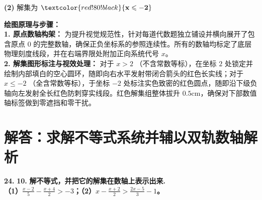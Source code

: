 \vspace{0.6cm}
\noindent \textbf{(2)} 解集为 $\textcolor{red!80!black}{\mathbf{x \leqslant -2}}$ \par\vspace{0.2cm}
\begin{center}
\end{center}

\vspace{0.4cm}
{\small\color{blue!70!black}
\textbf{绘图原理与步骤：}\\
\textbf{1. 原点数轴构架：} 为提升视觉规范性，针对每道代数题独立铺设并横向展开了包含原点 $0$ 的完整数轴，确保正负坐标系的参照连续性。所有的数轴均标定了底层物理刻度线段，并在右端界限处附加正向系统代号 $x$。\\
\textbf{2. 解集图形标注与视效处理：} 对于 $x > 2$ （不含常数等标），在坐标 $2$ 处锁定并绘制内部填白的空心圆环，随即向右水平发射带闭合箭头的红色长实线；对于 $x \leqslant -2$ （全含常数等标），于坐标 $-2$ 处标注实色致密的红色圆点，随即沿下级负轴向左发射全长红色防刺穿实线段。红色解集组整体拔升 $0.5\mathrm{cm}$，确保对下部数值轴标签做到零遮挡和零干扰。
}

\newpage



\section{解答：求解不等式系统并辅以双轨数轴解析}

\vspace{0.6cm}

\textbf{\LARGE 24.} \textbf{\color{cyan!80!blue} 10. }\textbf{解不等式，并把它的解集在数轴上表示出来.\\
（1）$\frac{x-2}{5} - \frac{x+4}{2} > -3$；\hspace{2cm}（2）$x - \frac{x+2}{2} > \frac{2x-5}{3} - 1$。}

